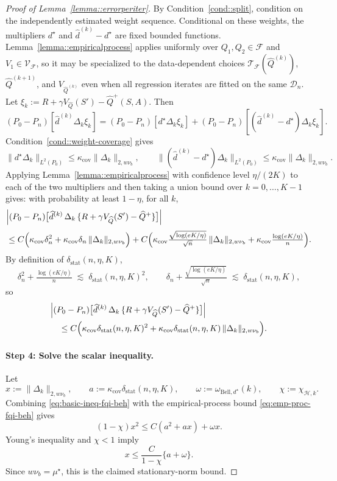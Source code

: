 \documentclass{article}
\theoremstyle{plain}
\theoremstyle{definition}
\theoremstyle{remark}
\begin{document}
\begin{proof}[Proof of Lemma~\ref{lemma::errorperiter}]
By Condition~\ref{cond::split}, condition on the independently estimated
weight sequence. Conditional on these weights, the multipliers \(d^\star\) and
\(\widehat d^{(k)}-d^\star\) are fixed bounded functions.
Lemma~\ref{lemma::empiricalprocess} applies uniformly over
\(Q_1,Q_2\in\mathcal F\) and \(V_1\in\mathcal V_{\mathcal F}\), so it may be
specialized to the data-dependent choices
\(\mathcal T_{\mathcal F}(\widehat Q^{(k)})\), \(\widehat Q^{(k+1)}\), and
\(V_{\widehat Q^{(k)}}\) even when all regression iterates are fitted on the
same \(\mathcal D_n\). Let
\(\xi_k:=R+\gamma V_{\widehat Q}(S')-\widehat Q^+(S,A)\). Then
\[
(P_0-P_n)[\widehat d^{(k)}\Delta_k\xi_k]
=
(P_0-P_n)[d^\star\Delta_k\xi_k]
+
(P_0-P_n)[(\widehat d^{(k)}-d^\star)\Delta_k\xi_k].
\]
Condition~\ref{cond::weight-coverage} gives
\[
\|d^\star\Delta_k\|_{L^2(P_0)}
\le
\kappa_{\mathrm{cov}}\|\Delta_k\|_{2,w\nu_b},
\qquad
\|(\widehat d^{(k)}-d^\star)\Delta_k\|_{L^2(P_0)}
\le
\kappa_{\mathrm{cov}}\|\Delta_k\|_{2,w\nu_b}.
\]
Applying Lemma~\ref{lemma::empiricalprocess} with confidence level
\(\eta/(2K)\) to each of the two multipliers and then taking a union bound
over \(k=0,\dots,K-1\) gives: with probability at least \(1-\eta\), for all
\(k\),
\begin{align*}
&\Bigl|
  (P_0 - P_n)\big[
    \widehat d^{(k)}\,
    \Delta_k\,
    \{R + \gamma V_{\widehat Q}(S') - \widehat Q^+\}
  \big]
\Bigr|
\\[0.3em]
&\le
C\Bigl(
  \kappa_{\mathrm{cov}}\delta_n^2
  +
  \kappa_{\mathrm{cov}}\delta_n\,\|\Delta_k\|_{2,w\nu_b}
\Bigr)
+
C\Bigl(
  \kappa_{\mathrm{cov}}
  \tfrac{\sqrt{\log(eK/\eta)}}{\sqrt{n}}\,
    \|\Delta_k\|_{2,w\nu_b}
  +
  \kappa_{\mathrm{cov}}\tfrac{\log(eK/\eta)}{n}
\Bigr).
\end{align*}
By definition of $\delta_{\mathrm{stat}}(n,\eta,K)$,
\[
\delta_n^2 + \tfrac{\log(eK/\eta)}{n}
\;\lesssim\;
\delta_{\mathrm{stat}}(n,\eta,K)^2,
\qquad
\delta_n + \tfrac{\sqrt{\log(eK/\eta)}}{\sqrt n}
\;\lesssim\;
\delta_{\mathrm{stat}}(n,\eta,K),
\]
so
\begin{align}
\label{eq:emp-proc-fqi-beh}
&\Bigl|
  (P_0 - P_n)\big[
    \widehat d^{(k)}\,
    \Delta_k\,
    \{R + \gamma V_{\widehat Q}(S') - \widehat Q^+\}
  \big]
\Bigr|
\\
&\quad\le
C\Bigl(
  \kappa_{\mathrm{cov}}\delta_{\mathrm{stat}}(n,\eta,K)^2
  +
  \kappa_{\mathrm{cov}}\delta_{\mathrm{stat}}(n,\eta,K)\,
  \|\Delta_k\|_{2,w\nu_b}
\Bigr).
\nonumber
\end{align}


\paragraph{Step 4: Solve the scalar inequality.}
Let
\[
x:=\|\Delta_k\|_{2,w\nu_b},
\qquad
 a:=\kappa_{\mathrm{cov}}\delta_{\mathrm{stat}}(n,\eta,K),
\qquad
\omega:=\omega_{\mathrm{Bell},d^\star}(k),
\qquad
\chi:=\chi_{\mathcal H,k}.
\]
Combining \eqref{eq:basic-ineq-fqi-beh} with the empirical-process bound
\eqref{eq:emp-proc-fqi-beh} gives
\[
(1-\chi)x^2
\le
C(a^2+a x)+\omega x .
\]
Young's inequality and \(\chi<1\) imply
\[
x
\le
\frac{C}{1-\chi}
\{a+\omega\}.
\]
Since \(w\nu_b=\mu^\star\), this is the claimed stationary-norm bound.


\end{proof}
\end{document}

